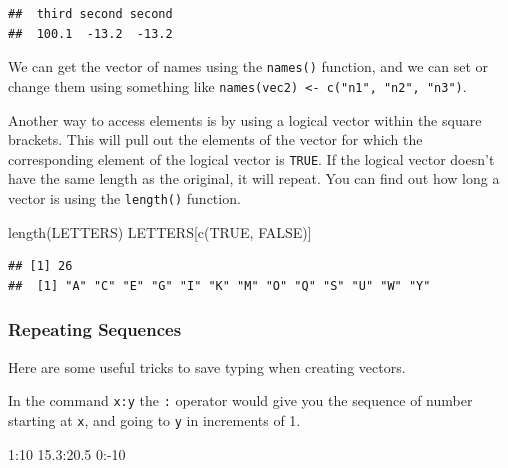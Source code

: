 \documentclass[
  oneside]{book}
\newenvironment{Shaded}{\begin{snugshade}}{\end{snugshade}}
\newcommand{\ConstantTok}[1]{\textcolor[rgb]{0.00,0.00,0.00}{#1}}
\newcommand{\DecValTok}[1]{\textcolor[rgb]{0.00,0.00,0.81}{#1}}
\newcommand{\FloatTok}[1]{\textcolor[rgb]{0.00,0.00,0.81}{#1}}
\newcommand{\FunctionTok}[1]{\textcolor[rgb]{0.00,0.00,0.00}{#1}}
\newcommand{\NormalTok}[1]{#1}
\newcommand{\SpecialCharTok}[1]{\textcolor[rgb]{0.00,0.00,0.00}{#1}}
\begin{document}
\begin{verbatim}
##  third second second 
##  100.1  -13.2  -13.2
\end{verbatim}

\begin{info}
We can get the vector of names using the \texttt{names()} function, and we can set or change them using something like \texttt{names(vec2)\ \textless{}-\ c("n1",\ "n2",\ "n3")}.

\end{info}

Another way to access elements is by using a logical vector within the square brackets. This will pull out the elements of the vector for which the corresponding element of the logical vector is \texttt{TRUE}. If the logical vector doesn't have the same length as the original, it will repeat. You can find out how long a vector is using the \texttt{length()} function.

\begin{Shaded}
\begin{Highlighting}[]
\FunctionTok{length}\NormalTok{(LETTERS)}
\NormalTok{LETTERS[}\FunctionTok{c}\NormalTok{(}\ConstantTok{TRUE}\NormalTok{, }\ConstantTok{FALSE}\NormalTok{)]}
\end{Highlighting}
\end{Shaded}

\begin{verbatim}
## [1] 26
##  [1] "A" "C" "E" "G" "I" "K" "M" "O" "Q" "S" "U" "W" "Y"
\end{verbatim}

\hypertarget{rep_seq}{%
\subsubsection{Repeating Sequences}\label{rep_seq}}

Here are some useful tricks to save typing when creating vectors.

In the command \texttt{x:y} the \texttt{:} operator would give you the sequence of number starting at \texttt{x}, and going to \texttt{y} in increments of 1.

\begin{Shaded}
\begin{Highlighting}[]
\DecValTok{1}\SpecialCharTok{:}\DecValTok{10}
\FloatTok{15.3}\SpecialCharTok{:}\FloatTok{20.5}
\DecValTok{0}\SpecialCharTok{:{-}}\DecValTok{10}
\end{Highlighting}
\end{Shaded}
\end{document}
